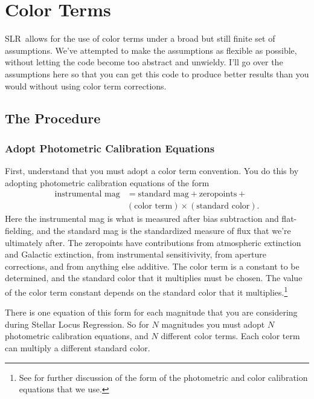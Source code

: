 \documentclass{report}
\newcommand{\slr}{SLR}
\begin{document}
\chapter{Color Terms}
\label{sec:colorterms}

\slr\ allows for the use of color terms under a broad but still finite
set of assumptions.  We've attempted to make the assumptions as
flexible as possible, without letting the code become too abstract and
unwieldy.  I'll go over the assumptions here so that you can get this
code to produce better results than you would without using color term
corrections.


\section{The Procedure}
\subsection{Adopt Photometric Calibration Equations}

First, understand that you must adopt a color term convention.  You do
this by adopting photometric calibration equations of the form
\begin{subequations} 
\begin{align}
  \textrm{instrumental mag} & = \textrm{standard mag} + \textrm{zeropoints} + \\
  & (\textrm{color term})\times(\textrm{standard color}).
\end{align}
\end{subequations}
Here the instrumental mag is what is measured after bias subtraction
and flat-fielding, and the standard mag is the standardized measure of
flux that we're ultimately after.  The zeropoints have contributions
from atmospheric extinction and Galactic extinction, from instrumental
sensitivivity, from aperture corrections, and from anything else
additive.  The color term is a constant to be determined, and the
standard color that it multiplies must be chosen.  The value of the
color term constant depends on the standard color that it
multiplies.\footnote{See \citet{bib:slr} for further discussion of the
  form of the photometric and color calibration equations that we use.
}

There is one equation of this form for each magnitude that you are
considering during Stellar Locus Regression.  So for $N$ magnitudes
you must adopt $N$ photometric calibration equations, and $N$
different color terms.  Each color term can multiply a different
standard color.
\end{document}
